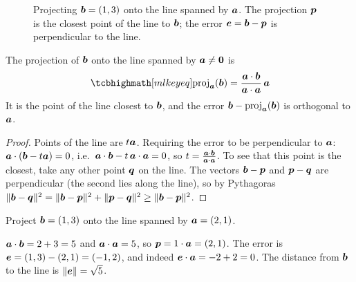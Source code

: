 \begin{figure}[htbp]
\centering
{}
\caption{Projecting $\bm{b} = (1,3)$ onto the line spanned by $\bm{a}$. The
  projection $\bm{p}$ is the closest point of the line to $\bm{b}$; the error
  $\bm{e} = \bm{b} - \bm{p}$ is perpendicular to the line.}
\label{fig:projection-line}
\end{figure}

\begin{theorem}\label{thm:projection-line}
The projection of $\bm{b}$ onto the line spanned by $\bm{a} \neq \bm{0}$ is
\[
  \keyeq{\proj_{\va}(\vb) = \frac{\va\cdot\vb}{\va\cdot\va}\,\va}
\]
It is the point of the line closest to $\bm{b}$, and the error
$\bm{b} - \operatorname{proj}_{\bm{a}}(\bm{b})$ is orthogonal to $\bm{a}$.
\end{theorem}

\begin{proof}
Points of the line are $t\bm{a}$. Requiring the error to be perpendicular to
$\bm{a}$: $\bm{a}\cdot(\bm{b} - t\bm{a}) = 0$, i.e.\ $\bm{a}\cdot\bm{b} - t\,\bm{a}\cdot\bm{a} = 0$, so
$t = \frac{\bm{a}\cdot\bm{b}}{\bm{a}\cdot\bm{a}}$. To see that this point is the closest,
take any other point $\bm{q}$ on the line. The vectors $\bm{b} - \bm{p}$ and $\bm{p} - \bm{q}$
are perpendicular (the second lies along the line), so by Pythagoras
$\lVert\bm{b} - \bm{q}\rVert^2 = \lVert\bm{b} - \bm{p}\rVert^2 + \lVert\bm{p} - \bm{q}\rVert^2 \ge \lVert\bm{b} -
\bm{p}\rVert^2$.
\end{proof}

\begin{example}
Project $\bm{b} = (1, 3)$ onto the line spanned by $\bm{a} = (2, 1)$.

\sol $\bm{a}\cdot\bm{b} = 2 + 3 = 5$ and $\bm{a}\cdot\bm{a} = 5$, so $\bm{p} = 1\cdot\bm{a} =
(2, 1)$. The error is $\bm{e} = (1, 3) - (2, 1) = (-1, 2)$, and indeed
$\bm{e}\cdot\bm{a} = -2 + 2 = 0$. The distance from $\bm{b}$ to the line is
$\lVert\bm{e}\rVert = \sqrt5$.
\end{example}

